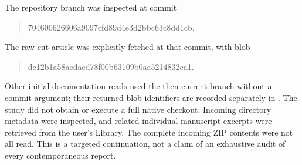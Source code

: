 \documentclass[11pt]{article}
\theoremstyle{definition}
\newcommand{\code}[1]{\texttt{\detokenize{#1}}}
\begin{document}
The repository branch was inspected at commit
\begin{quote}\small\ttfamily
704600626606a9097cfd89d4e3d2bbc63c8dd1cb.
\end{quote}
The raw-cut article was explicitly fetched at that commit, with blob
\begin{quote}\small\ttfamily
dc12b1a58aedaed78f00b63109b0aa5214832ca1.
\end{quote}
Other initial documentation reads used the then-current branch without a commit argument; their returned blob identifiers are recorded separately in \code{SOURCE_AUDIT.md}. The study did not obtain or execute a full native checkout. Incoming directory metadata were inspected, and related individual manuscript excerpts were retrieved from the user's Library. The complete incoming ZIP contents were not all read. This is a targeted continuation, not a claim of an exhaustive audit of every contemporaneous report.
\end{document}
